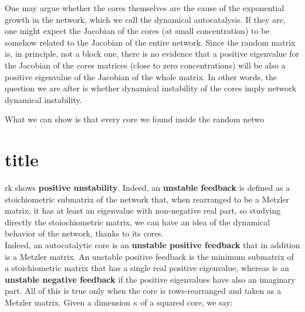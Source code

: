 \documentclass{article}
\begin{document}
One may argue whether the cores themselves are the cause of the exponential growth in the network, which we call the dynamical autocatalysis. If they are, one might expect the Jacobian of the cores (at small concentration) to be somehow related to the Jacobian of the entire network. Since the random matrix is, in principle, not a block one, there is no evidence that a positive eigenvalue for the Jacobian of the cores matrices (close to zero concentrations) will be also a positive eigenvalue of the Jacobian of the whole matrix. In other words, the question we are after is whether dynamical instability of the cores imply network dynamical instability.

What we can show is that every core we found inside the random netwo\part{title}rk shows \textbf{positive unstability}. Indeed, an \textbf{unstable feedback} is defined as a stoichiometric submatrix of the network that, when rearranged to be a Metzler matrix, it has at least an eigenvalue with non-negative real part, so studying directly the stoiochiometric matrix, we can have an idea of the dynamical behavior of the network, thanks to its cores.
\\
Indeed, an autocatalytic core is an \textbf{unstable positive feedback} that in addition is a Metzler matrix. An unstable positive feedback is the minimum submatrix of a stoichiometric matrix that has a single real positive eigenvalue, whereas is an \textbf{unstable negative feedback} if the positive eigenvalues have also an imaginary part. All of this is true only when the core is rows-rearranged and taken as a Metzler matrix. Given a dimension $\kappa$ of a squared core, we say:
\end{document}

